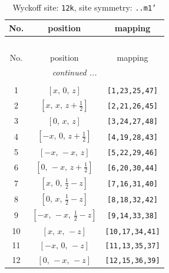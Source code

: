 \documentclass[fleqn,8pt]{jsarticle}
\begin{document}
\begin{longtable}{ccc}
\caption{Wyckoff site: {\tt 12k}, site symmetry: {\tt ..m1'}}
 \\
 \hline \hline
No. & position & mapping \\ \hline \endfirsthead

\multicolumn{2}{l}{\tablename\ \thetable{}} \\
 \hline \hline
No. & position & mapping \\ \hline \endhead

 \hline \hline
\multicolumn{2}{r}{\footnotesize\it continued ...} \\ \endfoot

 \hline \hline
\multicolumn{2}{r}{} \\ \endlastfoot

1 & $\left[ x,\, 0,\, z \right]$ & {\tt [1,23,25,47]} \\ \hline
2 & $\left[ x,\, x,\, z + \frac{1}{2} \right]$ & {\tt [2,21,26,45]} \\ \hline
3 & $\left[ 0,\, x,\, z \right]$ & {\tt [3,24,27,48]} \\ \hline
4 & $\left[ - x,\, 0,\, z + \frac{1}{2} \right]$ & {\tt [4,19,28,43]} \\ \hline
5 & $\left[ - x,\, - x,\, z \right]$ & {\tt [5,22,29,46]} \\ \hline
6 & $\left[ 0,\, - x,\, z + \frac{1}{2} \right]$ & {\tt [6,20,30,44]} \\ \hline
7 & $\left[ x,\, 0,\, \frac{1}{2} - z \right]$ & {\tt [7,16,31,40]} \\ \hline
8 & $\left[ 0,\, x,\, \frac{1}{2} - z \right]$ & {\tt [8,18,32,42]} \\ \hline
9 & $\left[ - x,\, - x,\, \frac{1}{2} - z \right]$ & {\tt [9,14,33,38]} \\ \hline
10 & $\left[ x,\, x,\, - z \right]$ & {\tt [10,17,34,41]} \\ \hline
11 & $\left[ - x,\, 0,\, - z \right]$ & {\tt [11,13,35,37]} \\ \hline
12 & $\left[ 0,\, - x,\, - z \right]$ & {\tt [12,15,36,39]} \\
\end{longtable}
\renewcommand{\arraystretch}{1.2}
\end{document}
